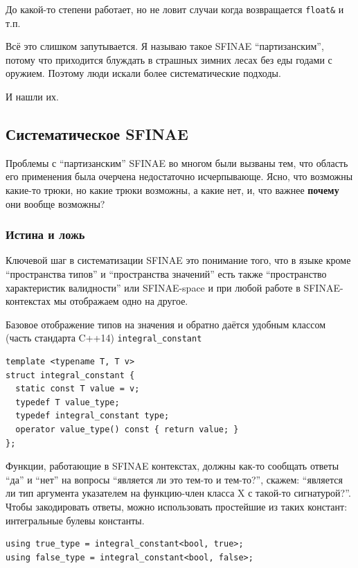 \documentclass[a4paper,12pt,oneside]{article}
\begin{document}
До какой-то степени работает, но не ловит случаи когда возвращается \lstinline!float&! и т.п.

Всё это слишком запутывается. Я называю такое SFINAE ``партизанским'', потому что приходится блуждать в страшных зимних лесах без еды годами с оружием. Поэтому люди искали более систематические подходы.

И нашли их.

\pagebreak
\subsection{Систематическое SFINAE}

Проблемы с ``партизанским'' SFINAE во многом были вызваны тем, что область его применения была очерчена недостаточно исчерпывающе. Ясно, что возможны какие-то трюки, но какие трюки возможны, а какие нет, и, что важнее \textbf{почему} они вообще возможны?

\subsubsection{Истина и ложь}

Ключевой шаг в систематизации SFINAE это понимание того, что в языке кроме ``пространства типов'' и ``пространства значений'' есть также ``пространство характеристик валидности'' или SFINAE-space и при любой работе в SFINAE-контекстах мы отображаем одно на другое.

Базовое отображение типов на значения и обратно даётся удобным классом (часть стандарта C++14) \lstinline!integral_constant!

\begin{lstlisting}
template <typename T, T v> 
struct integral_constant {
  static const T value = v;
  typedef T value_type;
  typedef integral_constant type;
  operator value_type() const { return value; } 
};
\end{lstlisting}

Функции, работающие в SFINAE контекстах, должны как-то сообщать ответы ``да'' и ``нет'' на вопросы ``является ли это тем-то и тем-то?'', скажем: ``является ли тип аргумента указателем на функцию-член класса X с такой-то сигнатурой?''. Чтобы закодировать ответы, можно использовать простейшие из таких констант: интегральные булевы константы.

\begin{lstlisting}
using true_type = integral_constant<bool, true>;
using false_type = integral_constant<bool, false>;
\end{lstlisting}
\end{document}
